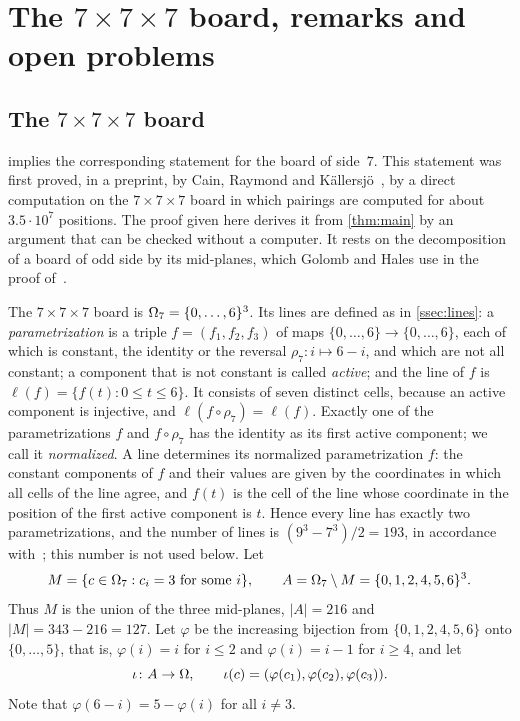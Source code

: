 \section{The \texorpdfstring{$7\times7\times7$}{7x7x7} board, remarks and open
problems}\label{sec:discussion}

\subsection{The \texorpdfstring{$7\times7\times7$}{7x7x7} board}\label{ssec:seven}

 implies the corresponding statement for the board of side~$7$. This statement was first
proved, in a preprint, by Cain, Raymond and K\"allersj\"o~\cite{CainRaymondKallersjo2025}, by a direct computation on
the $7\times7\times7$ board in which pairings are computed for about $3.5\cdot 10^7$ positions. The
proof given here derives it from \cref{thm:main} by an argument that can be checked without a computer. It rests
on the decomposition of a board of odd side by its mid-planes, which Golomb and Hales use in the proof
of~\cite[Theorem~3]{GolombHales2002}.

The $7\times7\times7$ board is $\Omega_7=\{0,\dots,6\}^3$. Its lines are defined as in \cref{ssec:lines}:
a \emph{parametrization} is a triple $f=(f_1,f_2,f_3)$ of maps $\{0,\dots,6\}\to\{0,\dots,6\}$, each of
which is constant, the identity or the reversal $\rho_7\colon i\mapsto 6-i$, and which are not all
constant; a component that is not constant is called \emph{active}; and the line of $f$ is
$\ell(f)=\{f(t):0\le t\le 6\}$. It consists of seven distinct cells, because an active component is
injective, and $\ell(f\circ\rho_7)=\ell(f)$. Exactly one of the parametrizations $f$ and $f\circ\rho_7$
has the identity as its first active component; we call it \emph{normalized}. A line determines its
normalized parametrization $f$: the constant components of $f$ and their values are given by the
coordinates in which all cells of the line agree, and $f(t)$ is the cell of the line whose coordinate in
the position of the first active component is $t$. Hence every line has exactly two parametrizations, and
the number of lines is $(9^3-7^3)/2=193$, in accordance with~\cite[Theorem~1]{GolombHales2002}; this number
is not used below.
Let
\[
  M=\{c\in\Omega_7 : c_i=3 \text{ for some } i\},\qquad A=\Omega_7\setminus M=\{0,1,2,4,5,6\}^3 .
\]
Thus $M$ is the union of the three mid-planes, $|A|=216$ and $|M|=343-216=127$. Let $\varphi$ be the
increasing bijection from $\{0,1,2,4,5,6\}$ onto $\{0,\dots,5\}$, that is, $\varphi(i)=i$ for $i\le 2$
and $\varphi(i)=i-1$ for $i\ge 4$, and let
\[
  \iota\colon A\to\Omega,\qquad \iota(c)=(\varphi(c_1),\varphi(c_2),\varphi(c_3)).
\]
Note that $\varphi(6-i)=5-\varphi(i)$ for all $i\ne 3$.

